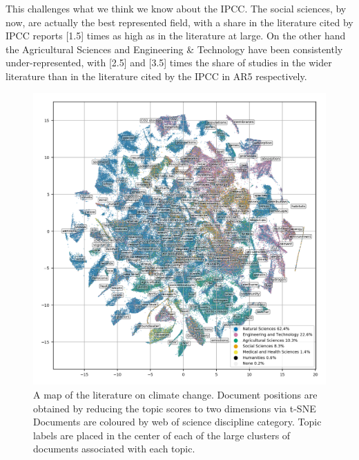 \documentclass{article}
\begin{document}
\begin{linenumbers}
		This challenges what we think we know about the IPCC. The social sciences, by now, are actually the best represented field, with a share in the literature cited by IPCC reports [1.5] times as high as in the literature at large.  On the other hand the Agricultural Sciences and Engineering \& Technology have been consistently under-represented, with [2.5] and [3.5] times the share of studies in the wider literature than in the literature cited by the IPCC in AR5 respectively. %
		
		\begin{figure}[htp]
			\begin{center}
				\includegraphics[width=180mm]{plots_pub/all_topic_words_oecds.png}
				\caption{A map of the literature on climate change. Document positions are obtained by reducing the topic scores to two dimensions via t-SNE Documents are coloured by web of science discipline category. Topic labels are placed in the center of each of the large clusters of documents associated with each topic. }
				\label{oecd_topic_map}
			\end{center}
		\end{figure}
		
		
		

\end{linenumbers}
\end{document}
